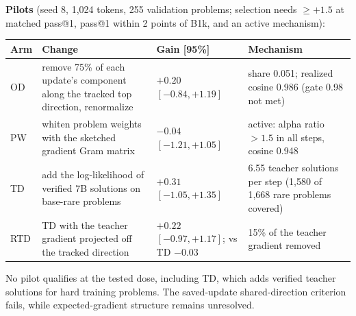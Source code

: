 \documentclass[11pt]{article}
\begin{document}
\textbf{Pilots} (seed 8, 1,024 tokens, 255 validation problems; selection needs $\ge+1.5$ at matched pass@1, pass@1 within 2 points of B1k, and an active mechanism):
\begin{center}\small
\begin{tabularx}{\linewidth}{@{}lYP{2.9cm}Y@{}}
\toprule
Arm & Change & Gain [95\%] & Mechanism\\
\midrule
OD & remove 75\% of each update's component along the tracked top direction, renormalize & $+0.20$ $[-0.84,+1.19]$ & share 0.051; realized cosine 0.986 (gate 0.98 not met)\\
PW & whiten problem weights with the sketched gradient Gram matrix & $-0.04$ $[-1.21,+1.05]$ & active: alpha ratio $>1.5$ in all steps, cosine 0.948\\
TD & add the log-likelihood of verified 7B solutions on base-rare problems & $+0.31$ $[-1.05,+1.35]$ & 6.55 teacher solutions per step (1,580 of 1,668 rare problems covered)\\
RTD & TD with the teacher gradient projected off the tracked direction & $+0.22$ $[-0.97,+1.17]$; vs TD $-0.03$ & 15\% of the teacher gradient removed\\
\bottomrule
\end{tabularx}
\end{center}
\begin{found}
No pilot qualifies at the tested dose, including TD, which adds verified teacher solutions for hard training problems. The saved-update shared-direction criterion fails, while expected-gradient structure remains unresolved.
\end{found}

\end{document}
